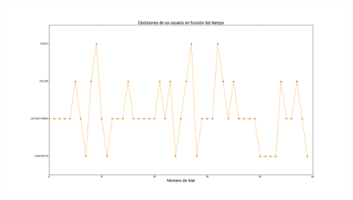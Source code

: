 \documentclass{beamer}
\begin{document}
\begin{frame}
\begin{figure}[h]
\begin{minipage}[c]{1\textwidth}
	\includegraphics[scale=0.11]{user7.png}
  \end{minipage}
\end{figure}
\end{frame}
\end{document}
